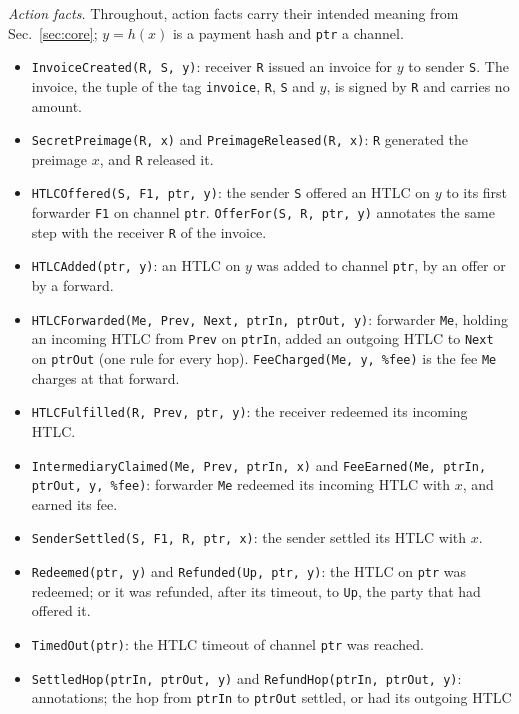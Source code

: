 \emph{Action facts.} Throughout, action facts carry their intended meaning from
Sec.~\ref{sec:core}; $y = h(x)$ is a payment hash and \texttt{ptr} a channel.
{\raggedright
\begin{itemize}
  \item \texttt{InvoiceCreated(R, S, y)}: receiver \texttt{R} issued an invoice for $y$ to sender
    \texttt{S}. The invoice, the tuple of the tag \texttt{\textquotesingle invoice\textquotesingle},
    \texttt{R}, \texttt{S} and $y$, is signed by \texttt{R} and carries no amount.
  \item \texttt{SecretPreimage(R, x)} and \texttt{PreimageReleased(R, x)}: \texttt{R} generated
    the preimage $x$, and \texttt{R} released it.
  \item \texttt{HTLCOffered(S, F1, ptr, y)}: the sender \texttt{S} offered an HTLC on $y$ to its
    first forwarder \texttt{F1} on channel \texttt{ptr}. \texttt{OfferFor(S, R, ptr, y)} annotates
    the same step with the receiver \texttt{R} of the invoice.
  \item \texttt{HTLCAdded(ptr, y)}: an HTLC on $y$ was added to channel \texttt{ptr}, by an offer
    or by a forward.
  \item \texttt{HTLCForwarded(Me, Prev, Next, ptrIn, ptrOut, y)}: forwarder \texttt{Me}, holding
    an incoming HTLC from \texttt{Prev} on \texttt{ptrIn}, added an outgoing HTLC to \texttt{Next}
    on \texttt{ptrOut} (one rule for every hop). \texttt{FeeCharged(Me, y, \%fee)} is the fee
    \texttt{Me} charges at that forward.
  \item \texttt{HTLCFulfilled(R, Prev, ptr, y)}: the receiver redeemed its incoming HTLC.
  \item \texttt{IntermediaryClaimed(Me, Prev, ptrIn, x)} and
    \texttt{FeeEarned(Me, ptrIn, ptrOut, y, \%fee)}: forwarder \texttt{Me} redeemed its incoming
    HTLC with $x$, and earned its fee.
  \item \texttt{SenderSettled(S, F1, R, ptr, x)}: the sender settled its HTLC with $x$.
  \item \texttt{Redeemed(ptr, y)} and \texttt{Refunded(Up, ptr, y)}: the HTLC on \texttt{ptr} was
    redeemed; or it was refunded, after its timeout, to \texttt{Up}, the party that had offered
    it.
  \item \texttt{TimedOut(ptr)}: the HTLC timeout of channel \texttt{ptr} was reached.
  \item \texttt{SettledHop(ptrIn, ptrOut, y)} and \texttt{RefundHop(ptrIn, ptrOut, y)}:
    annotations; the hop from \texttt{ptrIn} to \texttt{ptrOut} settled, or had its outgoing HTLC

\end{itemize}}

